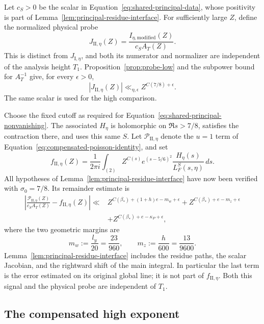 Let \(c_S>0\) be the scalar in Equation~\eqref{eq:shared-principal-data},
whose positivity is part of Lemma~\ref{lem:principal-residue-interface}.
For sufficiently large \(Z\), define the normalized physical probe
\[
 J_{\mathrm{II},\eta}(Z)
   =\frac{I_{\eta,\mathrm{modified}}(Z)}{c_S A_T(Z)}.
\]
This is distinct from \(J_{\mathrm I,\eta}\), and both its numerator and
normalizer are independent of the analysis height \(T_1\).
Proposition~\ref{prop:probe-low} and the subpower bound for \(A_T^{-1}\)
give, for every \(\epsilon>0\),
\begin{equation}\label{eq:part-II-normalized-low}
 |J_{\mathrm{II},\eta}(Z)|
 \ll_{\eta,\epsilon} Z^{C(7/8)+\epsilon}.
\end{equation}
The same scalar is used for the high comparison.

Choose the fixed cutoff as required for
Equation~\eqref{eq:shared-principal-nonvanishing}.  The associated
\(H_\eta\) is holomorphic on \(\Re s>7/8\), satisfies the contraction
there, and uses this same \(S\).  Let \(\mathscr P_{\mathrm{II},\eta}\)
denote the \(u=1\) term of Equation~\eqref{eq:compensated-poisson-identity},
and set
\[
 f_{\mathrm{II},\eta}(Z)=\frac1{2\pi i}\int_{(2)}
 Z^{C(s)}e^{(s-5/6)^2}\frac{H_\eta(s)}{L_F^S(s,\eta)}\,ds.
\]
All hypotheses of Lemma~\ref{lem:principal-residue-interface} have now
been verified with \(\sigma_0=7/8\).  Its remainder estimate is
\[
 \begin{split}
 \left|\frac{\mathscr P_{\mathrm{II},\eta}(Z)}{c_S A_T(Z)}
       -f_{\mathrm{II},\eta}(Z)\right|
 \ll{}&
 Z^{C(\beta_*)+(1+h)e-m_w+\epsilon}
 +Z^{C(\beta_*)+e-m_z+\epsilon}\\
 &+Z^{C(\beta_*)+e-\kappa_P+\epsilon},
 \end{split}
\]
where the two geometric margins are
\begin{equation}\label{old-eq:5.14}
 m_w:=\frac{l_y}{20}=\frac{23}{960},\qquad
 m_z:=\frac h{600}=\frac{13}{9600}.
\end{equation}
Lemma~\ref{lem:principal-residue-interface} includes the residue paths,
the scalar Jacobian, and
the rightward shift of the main integral.  In particular the last term
is the error estimated on its original global line; it is not part of
\(f_{\mathrm{II},\eta}\).  Both this signal and the physical probe are
independent of \(T_1\).

\subsection{The compensated high exponent}

